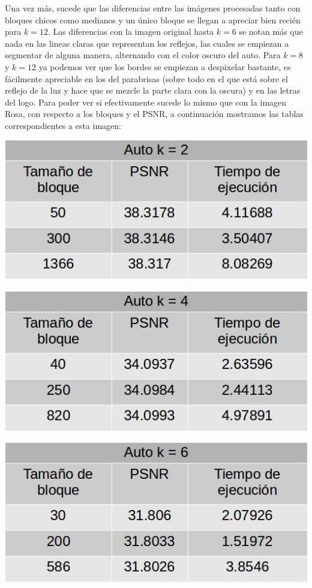 \documentclass[a4paper]{article}
\newcounter{col}
\begin{document}
\par Una vez más, sucede que las diferencias entre las imágenes procesadas tanto con bloques chicos como medianos y un único bloque se llegan a apreciar bien recién para $k = 12$. Las diferencias con la imagen original hasta $k = 6$ se notan más que nada en las lineas claras que representan los reflejos, las cuales se empiezan a segmentar de alguna manera, alternando con el color oscuro del auto. Para $k = 8$ y $k = 12$ ya podemos ver que los bordes se empiezan a despixelar bastante, es fácilmente apreciable en los del parabrisas (sobre todo en el que está sobre el reflejo de la luz y hace que se mezcle la parte clara con la oscura) y en las letras del logo.
\noindent \newline Para poder ver si efectivamente sucede lo mismo que con la imagen Rosa, con respecto a los bloques y el PSNR, a continuación mostramos las tablas correspondientes a esta imagen:
\newline

\centerline{
\includegraphics[scale=0.5]{imagenes/autok2Tabla.jpg}
}
\vspace{1cm}

\centerline{
\includegraphics[scale=0.5]{imagenes/autok4Tabla.jpg}
}
\vspace{1cm}

\centerline{
\includegraphics[scale=0.5]{imagenes/autok6Tabla.jpg}
}
\vspace{1cm}
\end{document}
